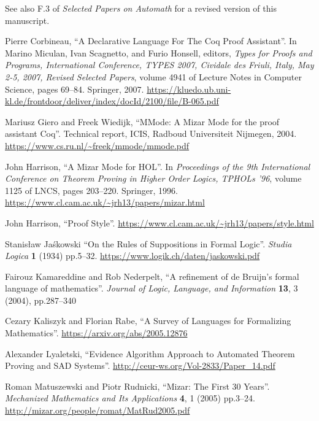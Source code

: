 \begin{enumerate}[label={[\arabic*]},left=0pt]
  See also {F.3} of \emph{Selected Papers on Automath} for a revised
  version of this manuscript.
\item\label{corbineau-czar} Pierre Corbineau,
  ``A Declarative Language For The Coq Proof Assistant''.
  In Marino Miculan, Ivan Scagnetto, and Furio Honsell, editors, \emph{Types for Proofs and Programs, International Conference, TYPES 2007, Cividale des Friuli, Italy, May 2-5, 2007, Revised Selected Papers},
  volume 4941 of Lecture Notes in Computer Science, pages 69--84. Springer, 2007.
  \url{https://kluedo.ub.uni-kl.de/frontdoor/deliver/index/docId/2100/file/B-065.pdf}
\item\label{giero-wiedijk-mmode} Mariusz Giero and Freek Wiedijk,
  ``MMode: A Mizar Mode for the proof assistant Coq''.
  Technical report, ICIS, Radboud Universiteit Nijmegen, 2004.
  \url{https://www.cs.ru.nl/~freek/mmode/mmode.pdf}
\item\label{harrison-mizar-mode} John Harrison,
  ``A Mizar Mode for HOL''.
  In \emph{Proceedings of the 9th International Conference on Theorem Proving in Higher Order Logics, TPHOLs '96}, volume
  1125 of LNCS, pages 203--220. Springer, 1996.
  \url{https://www.cl.cam.ac.uk/~jrh13/papers/mizar.html}
\item\label{harrison:proof-style} John Harrison,
  ``Proof Style''.
  \url{https://www.cl.cam.ac.uk/~jrh13/papers/style.html}
\item\label{jaskowski-suppositions} Stanis\l aw Ja\'skowski
  ``On the Rules of Suppositions in Formal Logic''.
  \emph{Studia Logica} \textbf{1} (1934) pp.5--32.
  \url{https://www.logik.ch/daten/jaskowski.pdf}
\item\label{kamareddine-nederpelt-wtt} Fairouz Kamareddine and Rob Nederpelt,
  ``A refinement of de Bruijn's formal language of mathematics''.
  \emph{Journal of Logic, Language, and Information} \textbf{13}, 3 (2004), pp.287--340
\item\label{kaliszyk-rabe-language} Cezary Kaliszyk and Florian Rabe,
  ``A Survey of Languages for Formalizing Mathematics''.
  \url{https://arxiv.org/abs/2005.12876}
\item\label{lyaletski-sad} Alexander Lyaletski,
  ``Evidence  Algorithm  Approach  to  Automated  Theorem  Proving
  and SAD Systems''.
  \url{http://ceur-ws.org/Vol-2833/Paper_14.pdf}
\item\label{matuszewski:mizar} Roman Matuszewski and Piotr Rudnicki,
  ``Mizar: The First 30 Years''.
  \emph{Mechanized Mathematics and Its Applications} \textbf{4}, 1 (2005) pp.3--24.
  \url{http://mizar.org/people/romat/MatRud2005.pdf}

\end{enumerate}
